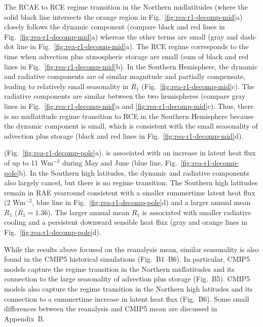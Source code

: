 \documentclass{ametsocV5}
\begin{document}
    The RCAE to RCE regime transition in the Northern midlatitudes (where the solid black line intersects the orange region in Fig.~\ref{fig:rea-r1-decomp-mid}a) closely follows the dynamic component (compare black and red lines in Fig.~\ref{fig:rea-r1-decomp-mid}a) whereas the other terms are small (gray and dash-dot line in Fig.~\ref{fig:rea-r1-decomp-mid}a). The RCE regime corresponds to the time when advection plus atmospheric storage are small (sum of black and red lines in Fig.~\ref{fig:rea-r1-decomp-mid}b). In the Southern Hemisphere, the dynamic and radiative components are of similar magnitude and partially compensate, leading to relatively small seasonality in $R_1$ (Fig.~\ref{fig:rea-r1-decomp-mid}c). The radiative components are similar between the two hemispheres (compare gray lines in Fig.~\ref{fig:rea-r1-decomp-mid}a and \ref{fig:rea-r1-decomp-mid}c). Thus, there is no midlatitude regime transition to RCE in the Southern Hemisphere because the dynamic component is small, which is consistent with the small seasonality of advection plus storage (black and red lines in Fig.~\ref{fig:rea-r1-decomp-mid}d).

     (Fig.~\ref{fig:rea-r1-decomp-pole}a).  is associated with an increase in latent heat flux of up to 11 Wm$^{-2}$ during May and June (blue line, Fig.~\ref{fig:rea-r1-decomp-pole}b). In the Southern high latitudes, the dynamic and radiative components also largely cancel, but there is no regime transition. The Southern high latitudes remain in RAE yearround consistent with a smaller summertime latent heat flux (2 Wm$^{-2}$, blue line in Fig.~\ref{fig:rea-r1-decomp-pole}d) and a larger annual mean $R_1$ ($\overline{R_1}=1.36$). The larger annual mean $R_1$ is associated with smaller radiative cooling and a persistent downward sensible heat flux (gray and orange lines in Fig.~\ref{fig:rea-r1-decomp-pole}d).
    
    While the results above focused on the reanalysis mean, similar seasonality is also found in the CMIP5 historical simulations (Fig.~B1--B6). In particular, CMIP5 models capture the regime transition in the Northern midlatitudes and its connection to the large seasonality of advection plus storage (Fig.~B5). CMIP5 models also capture the regime transition in the Northern high latitudes and its connection to a summertime increase in latent heat flux (Fig.~B6). Some small differences between the reanalysis and CMIP5 mean are discussed in Appendix~B.
\end{document}
